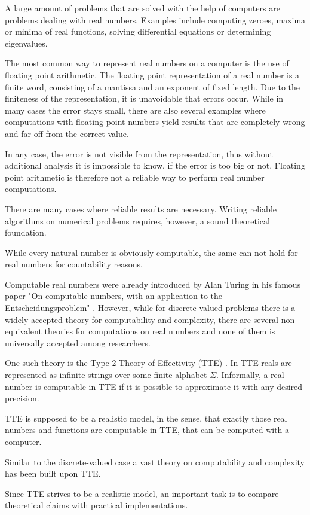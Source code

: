 A large amount of problems that are solved with the help of computers are
problems dealing with real numbers.
Examples include computing zeroes, maxima or minima of real functions, solving
differential equations or determining eigenvalues.

The most common way to represent real numbers on a computer is the use of floating point
arithmetic.
The floating point representation of a real number is a finite word, consisting
of a mantissa and an exponent of fixed length.
Due to the finiteness of the representation, it is unavoidable that errors
occur.
While in many cases the error stays small, there are also several examples
where computations with floating point numbers yield results that are
completely wrong and far off from the correct value.

In any case, the error is not visible from the representation, thus without
additional analysis it is impossible to know, if the error is too big or not.
Floating point arithmetic is therefore not a reliable way to perform real number
computations.

There are many cases where reliable results are necessary.
Writing reliable algorithms on numerical problems requires, however, a sound
theoretical foundation.

While every natural number is obviously computable, the same can not hold for
real numbers for countability reasons.

Computable real numbers were already introduced by Alan Turing in his famous
paper "On computable numbers, with an application to the Entscheidungsproblem"
\cite{turing36}.
However, while for discrete-valued problems there is a widely accepted theory for
computability and complexity, there are several non-equivalent theories for
computations on real numbers and none of them is universally accepted among
researchers.

One such theory is the Type-2 Theory of Effectivity (TTE) \cite{Wei}.
In TTE reals are represented as infinite strings over some finite alphabet
$\Sigma$.
Informally, a real number is computable in TTE if it is possible to approximate it with any
desired precision.

TTE is supposed to be a realistic model, in the sense, that exactly those
real numbers and functions are computable in TTE, that can be computed with a
computer.

Similar to the discrete-valued case a vast theory on computability and
complexity has been built upon TTE.

Since TTE strives to be a realistic model, an important task is to compare
theoretical claims with practical implementations.


